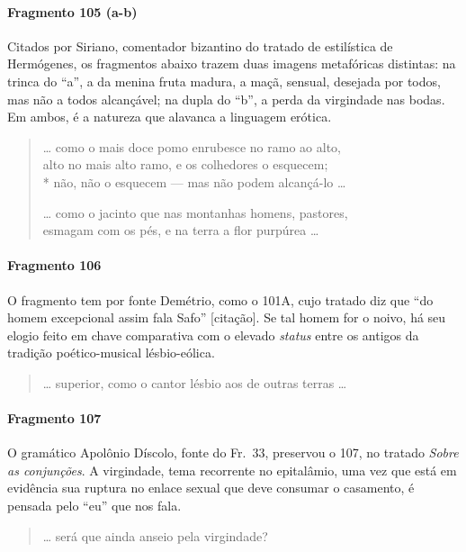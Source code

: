 {\paragraph{Fragmento 105 (a-b)}

{\small Citados por Siriano, comentador bizantino do tratado de estilística de
Hermógenes, os fragmentos abaixo trazem duas imagens metafóricas distintas: na
trinca do “a”, a da menina fruta madura, a maçã, sensual, desejada por todos,
mas não a todos alcançável; na dupla do “b”, a perda da virgindade nas bodas.
Em ambos, é a natureza que alavanca a linguagem erótica.}

\begin{verse}
\ldots{} como o mais doce pomo enrubesce no ramo ao alto,\\
alto no mais alto ramo, e os colhedores o esquecem;\\*
não, não o esquecem --- mas não podem alcançá-lo \ldots{}

\ldots{} como o jacinto que nas montanhas homens, pastores,\\
esmagam com os pés, e na terra a flor purpúrea \ldots{}
\end{verse}

\paragraph{Fragmento 106}

{\small O fragmento tem por fonte Demétrio, como o 101A, cujo tratado diz que
``do homem excepcional assim fala Safo” [citação]. Se tal homem for o
noivo, há seu elogio feito em chave comparativa com o elevado \textit{status}
entre os antigos da tradição poético-musical lésbio-eólica.}

\begin{verse}
\ldots{} superior, como o cantor lésbio aos de outras terras \ldots{}
\end{verse}

\paragraph{Fragmento 107}

{\small O gramático Apolônio Díscolo, fonte do Fr.~33, preservou o 107, no tratado
\textit{Sobre as conjunções}. A virgindade, tema recorrente no epitalâmio, uma
vez que está em evidência sua ruptura no enlace sexual que deve consumar o
casamento, é pensada pelo “eu” que nos fala.}

\begin{verse}
\ldots{} será que ainda anseio pela virgindade?
\end{verse}

}
